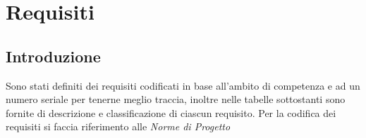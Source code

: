 


\newcommand{\RFM}{
    \stepcounter{M}
    \stepcounter{RF}
    \stepcounter{RF1}
    RF\arabic{RF}
}
\newcommand{\RFD}{
    \stepcounter{D}
    \stepcounter{RF}
    \stepcounter{RF2}
    RF\arabic{RF}
}
\newcommand{\RFO}{
    \stepcounter{O}
    \stepcounter{RF}
    \stepcounter{RF3}
    RF\arabic{RF}
}
\newcommand{\RVM}{
    \stepcounter{M}
    \stepcounter{RV}
    \stepcounter{RV1}
    RV\arabic{RV}
}
\newcommand{\RVD}{
    \stepcounter{D}
    \stepcounter{RV}
    \stepcounter{RV2}
    RV\arabic{RV}
}
\newcommand{\RVO}{
    \stepcounter{O}
    \stepcounter{RV}
    \stepcounter{RV3}
    RV\arabic{RV}
}
\newcommand{\RPM}{
    \stepcounter{M}
    \stepcounter{RP}
    \stepcounter{RP1}
    RP\arabic{RP}
}
\newcommand{\RPD}{
    \stepcounter{D}
    \stepcounter{RP}
    \stepcounter{RP2}
    RP\arabic{RP}
}
\newcommand{\RPO}{
    \stepcounter{O}
    \stepcounter{RP}
    \stepcounter{RP3}
    RP\arabic{RP}
}
\newcommand{\RQM}{
    \stepcounter{M}
    \stepcounter{RQ}
    \stepcounter{RQ1}
    RQ\arabic{RQ}
}
\newcommand{\RQD}{
    \stepcounter{D}
    \stepcounter{RQ}
    \stepcounter{RQ2}
    RQ\arabic{RQ}
}
\newcommand{\RQO}{
    \stepcounter{O}
    \stepcounter{RQ}
    \stepcounter{RQ3}
    RQ\arabic{RQ}
}



\section{Requisiti}
\subsection{Introduzione}
Sono stati definiti dei requisiti codificati in base all’ambito di competenza e ad un numero seriale per
tenerne meglio traccia, inoltre nelle tabelle sottostanti sono fornite di descrizione e classificazione di ciascun
requisito. 
Per la codifica dei requisiti si faccia riferimento alle \textit{Norme di Progetto}
